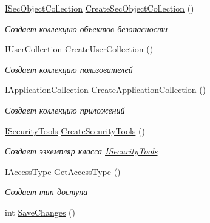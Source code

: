 \begin{DoxyCompactItemize}
\hyperlink{interface_security_1_1_interfaces_1_1_collections_1_1_i_sec_object_collection}{I\+Sec\+Object\+Collection} \hyperlink{interface_security_1_1_interfaces_1_1_i_security_factory_aa03c6ad65ac4dcf14f35f8ed659cf930}{Create\+Sec\+Object\+Collection} ()
\begin{DoxyCompactList}\small\item\em Создает коллекцию объектов безопасности \end{DoxyCompactList}\item 
\hyperlink{interface_security_1_1_interfaces_1_1_collections_1_1_i_user_collection}{I\+User\+Collection} \hyperlink{interface_security_1_1_interfaces_1_1_i_security_factory_af7bc3e5089a1611eea69ea5c4c8735c9}{Create\+User\+Collection} ()
\begin{DoxyCompactList}\small\item\em Создает коллекцию пользователей \end{DoxyCompactList}\item 
\hyperlink{interface_security_1_1_interfaces_1_1_collections_1_1_i_application_collection}{I\+Application\+Collection} \hyperlink{interface_security_1_1_interfaces_1_1_i_security_factory_a95eea08cd755ed6596a8896cb5c2910e}{Create\+Application\+Collection} ()
\begin{DoxyCompactList}\small\item\em Создает коллекцию приложений \end{DoxyCompactList}\item 
\hyperlink{interface_security_1_1_interfaces_1_1_i_security_tools}{I\+Security\+Tools} \hyperlink{interface_security_1_1_interfaces_1_1_i_security_factory_acf1eb07cd7264db66304340e9196b2af}{Create\+Security\+Tools} ()
\begin{DoxyCompactList}\small\item\em Создает эзкемпляр класса \hyperlink{interface_security_1_1_interfaces_1_1_i_security_tools}{I\+Security\+Tools} \end{DoxyCompactList}\item 
\hyperlink{interface_security_1_1_interfaces_1_1_model_1_1_i_access_type}{I\+Access\+Type} \hyperlink{interface_security_1_1_interfaces_1_1_i_security_factory_a0e9cedfa313829d1f3d74b5c439ad285}{Get\+Access\+Type} ()
\begin{DoxyCompactList}\small\item\em Создает тип доступа \end{DoxyCompactList}\item 
int \hyperlink{interface_security_1_1_interfaces_1_1_i_security_factory_a2af6dff231f7099ba7d02e2bc569683a}{Save\+Changes} ()

\end{DoxyCompactItemize}
